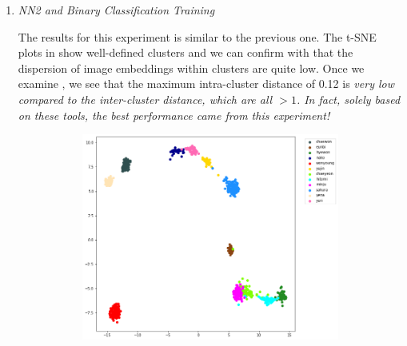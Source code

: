 \begin{enumerate}[left=0pt]
\item \it{NN2 and Binary Classification Training}

The results for this experiment is similar to the previous one. 
The t-SNE plots in  show well-defined clusters and we can confirm with  that the dispersion of image embeddings within clusters are quite low.
Once we examine , we see that the maximum intra-cluster distance of 0.12 is \it{very} low compared to the inter-cluster distance, which are all $>1$.
In fact, solely based on these tools, the best performance came from this experiment!

\begin{figure}[htbp]
    \centering
    \begin{subfigure}{0.325\textwidth}
        \centering
        \includegraphics[trim=31 20 100 0, clip, width=\textwidth]{images/faceReco/nn2-and-binary/tsne-1.png}     
    \end{subfigure}
    \hfill
    \begin{subfigure}{0.325\textwidth}
        \centering

\end{subfigure}
\end{figure}
\end{enumerate}
